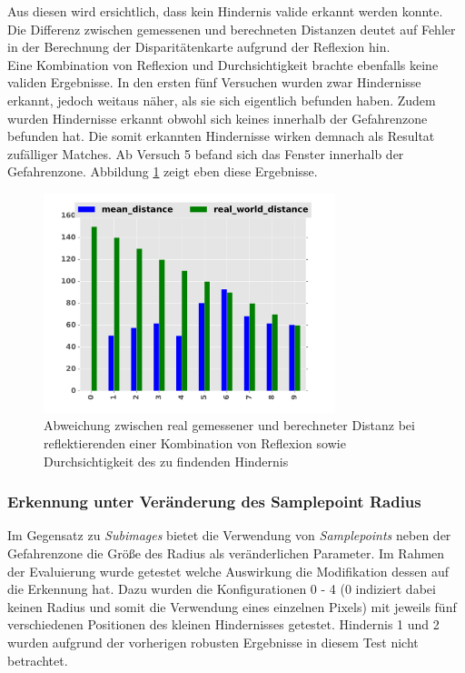 \noindent
Aus diesen wird ersichtlich, dass kein Hindernis valide erkannt werden konnte. Die Differenz zwischen gemessenen und berechneten Distanzen deutet auf Fehler in der Berechnung der Disparitätenkarte aufgrund der Reflexion hin.\\

\noindent
Eine Kombination von Reflexion und Durchsichtigkeit brachte ebenfalls keine validen Ergebnisse. In den ersten fünf Versuchen wurden zwar Hindernisse erkannt, jedoch weitaus näher, als sie sich eigentlich befunden haben. Zudem wurden Hindernisse erkannt obwohl sich keines innerhalb der Gefahrenzone befunden hat. Die somit erkannten Hindernisse wirken demnach als Resultat zufälliger Matches. Ab Versuch 5 befand sich das Fenster innerhalb der Gefahrenzone. Abbildung \ref{fig:combined} zeigt eben diese Ergebnisse.\\

\begin{figure}[h]
	\centering
	\includegraphics[width=8.5cm]{img/reflection/combined_bar}
	\caption{Abweichung zwischen real gemessener und berechneter Distanz bei reflektierenden einer Kombination von Reflexion sowie Durchsichtigkeit des zu findenden Hindernis}
	\label{fig:combined}
\end{figure}

\subsubsection{Erkennung unter Veränderung des Samplepoint Radius}
\label{subsec:test_samplepoint_radius}

Im Gegensatz zu \emph{Subimages} bietet die Verwendung von \emph{Samplepoints} neben der Gefahrenzone die Größe des Radius als veränderlichen Parameter. Im Rahmen der Evaluierung wurde getestet welche Auswirkung die Modifikation dessen auf die Erkennung hat. Dazu wurden die Konfigurationen 0 - 4 (0 indiziert dabei keinen Radius und somit die Verwendung eines einzelnen Pixels) mit jeweils fünf verschiedenen Positionen des kleinen Hindernisses getestet. Hindernis 1 und 2 wurden aufgrund der vorherigen robusten Ergebnisse in diesem Test nicht betrachtet.\\

